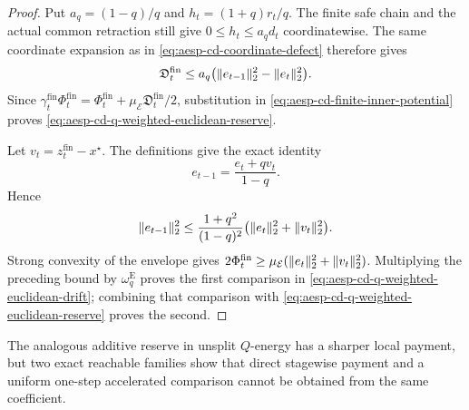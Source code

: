 \begin{proof}
Put $a_q=(1-q)/q$ and
$h_t=(1+q)r_t/q$.  The finite safe chain and the actual common retraction
still give $0\leq h_t\leq a_qd_t$ coordinatewise.  The same coordinate
expansion as in \cref{eq:aesp-cd-coordinate-defect} therefore gives
\begin{equation*}
 \mathfrak D_t^{\mathrm{fin}}
 \leq a_q\bigl(\lVert e_{t-1}\rVert_2^2-\lVert e_t\rVert_2^2\bigr).
\end{equation*}
Since
$\gamma_t^{\mathrm{fin}}\Phi_t^{\mathrm{fin}}
=\Phi_t^{\mathrm{fin}}+\mu_{\mathcal E}
\mathfrak D_t^{\mathrm{fin}}/2$, substitution in
\cref{eq:aesp-cd-finite-inner-potential} proves
\cref{eq:aesp-cd-q-weighted-euclidean-reserve}.

Let $v_t=z_t^{\mathrm{fin}}-x^\star$.  The definitions give the exact
identity
\begin{equation*}
 e_{t-1}=\frac{e_t+qv_t}{1-q}.
\end{equation*}
Hence
\begin{equation*}
 \lVert e_{t-1}\rVert_2^2
 \leq\frac{1+q^2}{(1-q)^2}
       \bigl(\lVert e_t\rVert_2^2+\lVert v_t\rVert_2^2\bigr).
\end{equation*}
Strong convexity of the envelope gives
$2\Phi_t^{\mathrm{fin}}\geq
\mu_{\mathcal E}(\lVert e_t\rVert_2^2+\lVert v_t\rVert_2^2)$.
Multiplying the preceding bound by $\omega_q^{\mathrm E}$ proves the first
comparison in \cref{eq:aesp-cd-q-weighted-euclidean-drift}; combining that
comparison with \cref{eq:aesp-cd-q-weighted-euclidean-reserve} proves the
second.
\end{proof}

The analogous additive reserve in unsplit $Q$-energy has a sharper local
payment, but two exact reachable families show that direct stagewise payment
and a uniform one-step accelerated comparison cannot be obtained from the
same coefficient.

